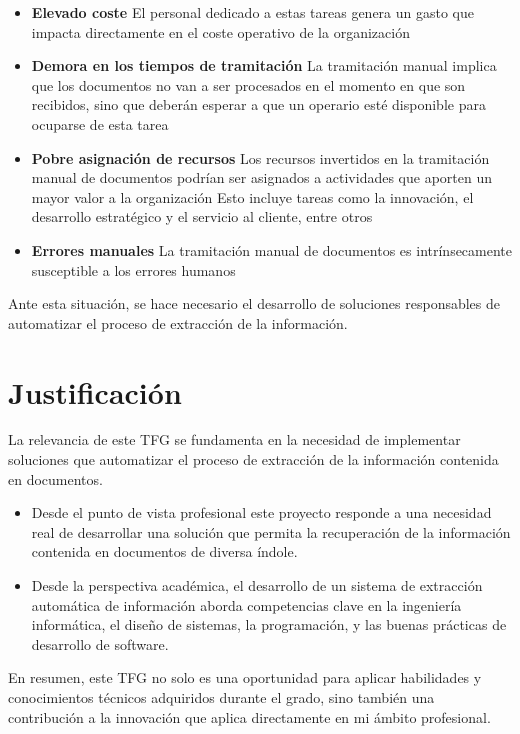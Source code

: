 \begin{itemize}
    \item \textbf{Elevado coste}
    El personal dedicado a estas tareas genera un gasto que impacta directamente en el coste operativo de la
    organización
    \item \textbf{Demora en los tiempos de tramitación}
    La tramitación manual implica que los documentos no van a ser procesados en el momento en que son recibidos, sino
    que deberán esperar a que un operario esté disponible para ocuparse de esta tarea
    \item \textbf{Pobre asignación de recursos}
    Los recursos invertidos en la tramitación manual de documentos podrían ser asignados a actividades que aporten un
    mayor valor a la organización
    Esto incluye tareas como la innovación, el desarrollo estratégico y el servicio al cliente, entre otros
    \item \textbf{Errores manuales}
    La tramitación manual de documentos es intrínsecamente susceptible a los errores humanos
\end{itemize}

Ante esta situación, se hace necesario el desarrollo de soluciones responsables de automatizar el proceso de extracción
de la información.


\section{Justificación}

La relevancia de este TFG se fundamenta en la necesidad de implementar soluciones que automatizar el proceso de
extracción de la información contenida en documentos.

\begin{itemize}
    \item
    Desde el punto de vista profesional este proyecto responde a una necesidad real de desarrollar una solución
    que permita la recuperación de la información contenida en documentos de diversa índole.
    \item
    Desde la perspectiva académica, el desarrollo de un sistema de extracción automática de información aborda
    competencias clave en la ingeniería informática, el diseño de sistemas, la programación, y las buenas prácticas de
    desarrollo de software.
\end{itemize}

En resumen, este TFG no solo es una oportunidad para aplicar habilidades y conocimientos técnicos adquiridos durante el
grado, sino también una contribución a la innovación que aplica directamente en mi ámbito profesional.


